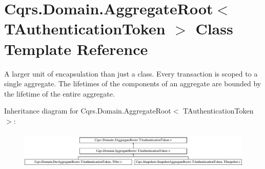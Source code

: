 \hypertarget{classCqrs_1_1Domain_1_1AggregateRoot}{}\section{Cqrs.\+Domain.\+Aggregate\+Root$<$ T\+Authentication\+Token $>$ Class Template Reference}
\label{classCqrs_1_1Domain_1_1AggregateRoot}


A larger unit of encapsulation than just a class. Every transaction is scoped to a single aggregate. The lifetimes of the components of an aggregate are bounded by the lifetime of the entire aggregate.  


Inheritance diagram for Cqrs.\+Domain.\+Aggregate\+Root$<$ T\+Authentication\+Token $>$\+:\begin{figure}[H]
\begin{center}
\leavevmode
\includegraphics[height=1.822126cm]{classCqrs_1_1Domain_1_1AggregateRoot}
\end{center}
\end{figure}
